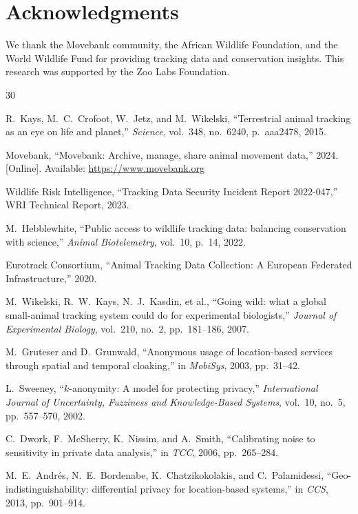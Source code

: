 \section*{Acknowledgments}

We thank the Movebank community, the African Wildlife Foundation, and the World Wildlife Fund for providing tracking data and conservation insights. This research was supported by the Zoo Labs Foundation.

\begin{thebibliography}{30}

R.~Kays, M.~C.~Crofoot, W.~Jetz, and M.~Wikelski, ``Terrestrial animal tracking as an eye on life and planet,'' \emph{Science}, vol.~348, no.~6240, p.~aaa2478, 2015.

Movebank, ``Movebank: Archive, manage, share animal movement data,'' 2024. [Online]. Available: \url{https://www.movebank.org}

Wildlife Risk Intelligence, ``Tracking Data Security Incident Report 2022-047,'' WRI Technical Report, 2023.

M.~Hebblewhite, ``Public access to wildlife tracking data: balancing conservation with science,'' \emph{Animal Biotelemetry}, vol.~10, p.~14, 2022.

Eurotrack Consortium, ``Animal Tracking Data Collection: A European Federated Infrastructure,'' 2020.

M.~Wikelski, R.~W.~Kays, N.~J.~Kasdin, et al., ``Going wild: what a global small-animal tracking system could do for experimental biologists,'' \emph{Journal of Experimental Biology}, vol.~210, no.~2, pp.~181--186, 2007.

M.~Gruteser and D.~Grunwald, ``Anonymous usage of location-based services through spatial and temporal cloaking,'' in \emph{MobiSys}, 2003, pp.~31--42.

L.~Sweeney, ``$k$-anonymity: A model for protecting privacy,'' \emph{International Journal of Uncertainty, Fuzziness and Knowledge-Based Systems}, vol.~10, no.~5, pp.~557--570, 2002.

C.~Dwork, F.~McSherry, K.~Nissim, and A.~Smith, ``Calibrating noise to sensitivity in private data analysis,'' in \emph{TCC}, 2006, pp.~265--284.

M.~E.~Andr{\'e}s, N.~E.~Bordenabe, K.~Chatzikokolakis, and C.~Palamidessi, ``Geo-indistinguishability: differential privacy for location-based systems,'' in \emph{CCS}, 2013, pp.~901--914.


\end{thebibliography}
